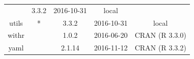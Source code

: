 \documentclass[]{article}
\begin{document}
\begin{itemize}
\begin{longtable}[]{@{}ccccc@{}}
\begin{minipage}[t]{0.05\columnwidth}
  \strut
  \end{minipage} & \begin{minipage}[t]{0.13\columnwidth}\centering\strut
  3.3.2\strut
  \end{minipage} & \begin{minipage}[t]{0.13\columnwidth}\centering\strut
  2016-10-31\strut
  \end{minipage} & \begin{minipage}[t]{0.29\columnwidth}\centering\strut
  local\strut
  \end{minipage}\tabularnewline
  \begin{minipage}[t]{0.13\columnwidth}\centering\strut
  utils\strut
  \end{minipage} & \begin{minipage}[t]{0.05\columnwidth}\centering\strut
  *\strut
  \end{minipage} & \begin{minipage}[t]{0.13\columnwidth}\centering\strut
  3.3.2\strut
  \end{minipage} & \begin{minipage}[t]{0.13\columnwidth}\centering\strut
  2016-10-31\strut
  \end{minipage} & \begin{minipage}[t]{0.29\columnwidth}\centering\strut
  local\strut
  \end{minipage}\tabularnewline
  \begin{minipage}[t]{0.13\columnwidth}\centering\strut
  withr\strut
  \end{minipage} & \begin{minipage}[t]{0.05\columnwidth}\centering\strut
  \strut
  \end{minipage} & \begin{minipage}[t]{0.13\columnwidth}\centering\strut
  1.0.2\strut
  \end{minipage} & \begin{minipage}[t]{0.13\columnwidth}\centering\strut
  2016-06-20\strut
  \end{minipage} & \begin{minipage}[t]{0.29\columnwidth}\centering\strut
  CRAN (R 3.3.0)\strut
  \end{minipage}\tabularnewline
  \begin{minipage}[t]{0.13\columnwidth}\centering\strut
  yaml\strut
  \end{minipage} & \begin{minipage}[t]{0.05\columnwidth}\centering\strut
  \strut
  \end{minipage} & \begin{minipage}[t]{0.13\columnwidth}\centering\strut
  2.1.14\strut
  \end{minipage} & \begin{minipage}[t]{0.13\columnwidth}\centering\strut
  2016-11-12\strut
  \end{minipage} & \begin{minipage}[t]{0.29\columnwidth}\centering\strut
  CRAN (R 3.3.2)\strut
  \end{minipage}\tabularnewline
  \bottomrule
  \end{longtable}
\end{itemize}
\end{document}

